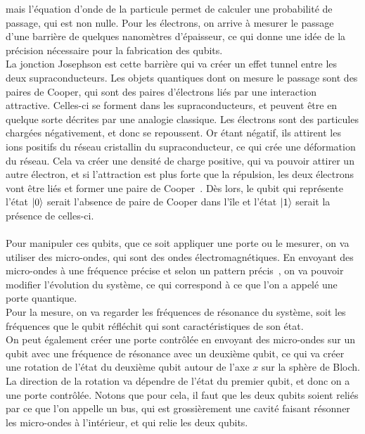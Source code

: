mais l'équation d'onde de la particule permet de calculer une probabilité de
passage, qui est non nulle.
Pour les électrons, on arrive à mesurer le passage d'une barrière de quelques
nanomètres d'épaisseur, ce qui donne une idée de la précision nécessaire pour
la fabrication des qubits.\\
La jonction Josephson est cette barrière qui va créer un effet tunnel entre
les deux supraconducteurs.
Les objets quantiques dont on mesure le passage sont des paires de Cooper,
qui sont des paires d'électrons liés par une interaction attractive.
Celles-ci se forment dans les supraconducteurs, et peuvent être en quelque sorte
décrites par une analogie classique.
Les électrons sont des particules chargées négativement, et donc se repoussent.
Or étant négatif, ils attirent les ions positifs du réseau cristallin du
supraconducteur, ce qui crée une déformation du réseau.
Cela va créer une densité de charge positive, qui va pouvoir attirer un autre
électron, et si l'attraction est plus forte que la répulsion, les deux électrons
vont être liés et former une paire de Cooper~\cite{wiki:cooper-pair}.
Dès lors, le qubit qui représente l'état $\ket{0}$ serait l'absence de paire de Cooper dans l'île
et l'état $\ket{1}$ serait la présence de celles-ci. \\ \\
Pour manipuler ces qubits, que ce soit appliquer une porte ou le mesurer, on va utiliser
des micro-ondes, qui sont des ondes électromagnétiques.
En envoyant des micro-ondes à une fréquence précise et selon un pattern précis~\cite{gate-impl},
on va pouvoir modifier l'évolution du système, ce qui correspond à ce
que l'on a appelé une porte quantique.\\
Pour la mesure, on va regarder les fréquences de résonance du système, soit les
fréquences que le qubit réfléchit qui sont caractéristiques de son état.\\
On peut également créer une porte contrôlée en envoyant des micro-ondes sur un
qubit avec une fréquence de résonance avec un deuxième qubit, ce qui va
créer une rotation de l'état du deuxième qubit autour de l'axe $x$ sur la sphère
de Bloch.
La direction de la rotation va dépendre de l'état du premier qubit, et donc on
a une porte contrôlée.
Notons que pour cela, il faut que les deux qubits soient reliés par ce que l'on
appelle un bus, qui est grossièrement une cavité faisant résonner les micro-ondes
à l'intérieur, et qui relie les deux qubits.\\ \\
